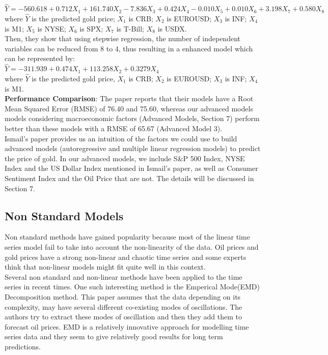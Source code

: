 \documentclass[runningheads]{llncs}
\begin{document}
$\hat{Y}=-560.618+0.712X_1+161.740X_2-7.836X_3 +0.424X_4-0.010X_5+0.010X_6+3.198X_7+0.580X_8$ \\	

where $\hat{Y}$ is the predicted gold price; $X_1$ is CRB; $X_2$ is EUROUSD; $X_3$ is INF; $X_4$ is M1; $X_5$ is NYSE; $X_6$ is SPX; $X_7$ is T-Bill; $X_8$ is USDX.\\

\noindent Then, they show that using stepwise regression, the number of independent variables can be reduced from 8 to 4, thus resulting in a enhanced model which can be represented by:  \\

$\hat{Y}=-311.939+0.474X_1+113.258X_2+0.3279X_4$ \\

where $\hat{Y}$ is the predicted gold price, $X_1$ is CRB; $X_2$ is EUROUSD; $X_3$ is INF; $X_4$ is M1. \\

\noindent \textbf{Performance Comparison}: The paper reports that their models have a Root Mean Squared Error (RMSE) of 76.40 and 75.60, whereas our advanced models models considering macroeconomic factors (Advanced Models, Section 7) perform better than these models with a RMSE of 65.67 (Advanced Model 3). \\

\noindent Ismail's paper provides us an intuition of the factors we could use to build advanced models (autoregressive and multiple linear regression models) to predict the price of gold. In our advanced models, we include S\&P 500 Index, NYSE Index and the US Dollar Index mentioned in Ismail's paper, as well as Consumer Sentiment Index and the Oil Price that are not. The details will be discussed in Section 7.\\

\subsection{Non Standard Models}

\noindent Non standard methods have gained popularity because most of the linear time series model fail to take into account the non-linearity of the data. Oil prices and gold prices have a strong non-linear and chaotic time series and some experts think that non-linear models might fit quite well in this context.\\

\noindent Several non standard and non-linear methods have been applied to the time series in recent times. One such interesting method is the Emperical Mode(EMD) Decomposition method\cite{oil-zhang}. This paper assumes that the data depending on its complexity, may have several different co-existing modes of oscillations. The authors try to extract these modes of oscillation and then they add them to forecast oil prices. EMD is a relatively innovative approach for modelling time series data and they seem to give relatively good results for long term predictions.\\
\end{document}
